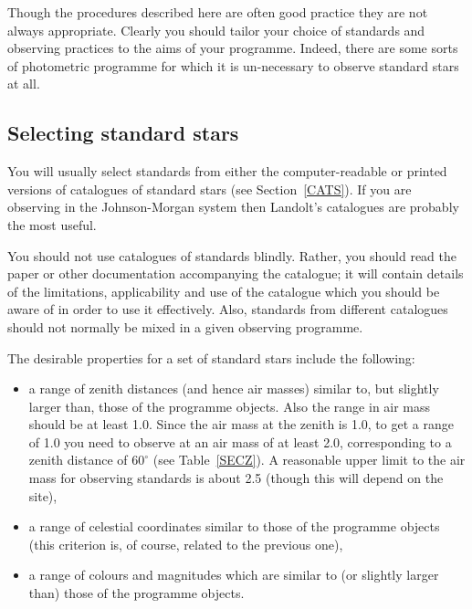 \documentclass[twoside,11pt]{article}
\begin{document}
Though the procedures described here are often good practice they are
not always appropriate.  Clearly you should tailor your choice of
standards and observing practices to the aims of your programme.
Indeed, there are some sorts of photometric programme for which it is
un-necessary to observe standard stars at all.

\subsection{\label{SEL_STANDARD}Selecting standard stars}

You will usually select standards from either the computer-readable or
printed versions of catalogues of standard stars (see
Section~\ref{CATS}).  If you are observing in the Johnson-Morgan system
then Landolt's catalogues are probably the most useful.

You should not use catalogues of standards blindly.  Rather, you should
read the paper or other documentation accompanying the catalogue; it
will contain details of the limitations, applicability and use of the
catalogue which you should be aware of in order to use it effectively.
Also, standards from different catalogues should not normally be mixed
in a given observing programme.

The desirable properties for a set of standard stars include the
following:

\begin{itemize}

  \item a range of zenith distances (and hence air masses) similar to,
   but slightly larger than, those of the programme objects.  Also
   the range in air mass should be at least 1.0.  Since the
   air mass at the zenith is 1.0, to get a range of 1.0 you need to
   observe at an air mass of at least 2.0, corresponding to a zenith
   distance of $60^{\circ}$ (see Table~\ref{SECZ}).  A reasonable upper
   limit to the air mass for observing standards is about 2.5 (though
   this will depend on the site),

  \item a range of celestial coordinates similar to those of the
   programme objects (this criterion is, of course, related to the
   previous one),

  \item a range of colours and magnitudes which are similar to (or
   slightly larger than) those of the programme objects.

\end{itemize}
\end{document}
